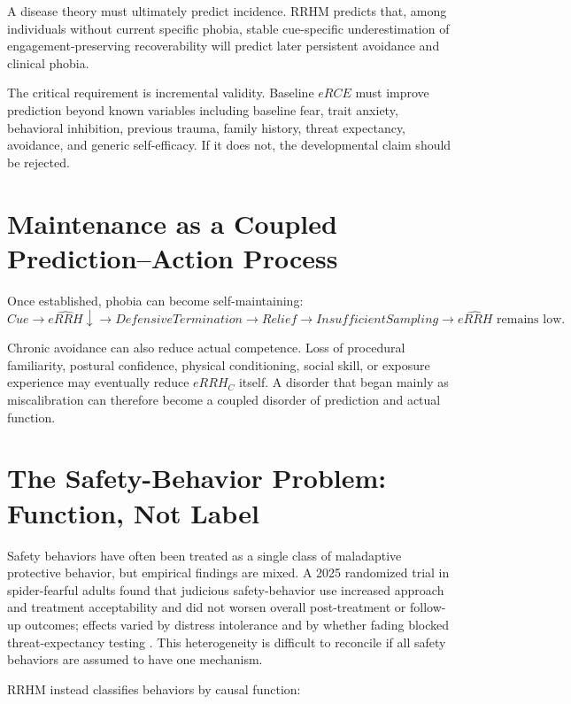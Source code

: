 \documentclass[11pt]{article}
\begin{document}
A disease theory must ultimately predict incidence. RRHM predicts that, among individuals without current specific phobia, stable cue-specific underestimation of engagement-preserving recoverability will predict later persistent avoidance and clinical phobia.

The critical requirement is incremental validity. Baseline $eRCE$ must improve prediction beyond known variables including baseline fear, trait anxiety, behavioral inhibition, previous trauma, family history, threat expectancy, avoidance, and generic self-efficacy. If it does not, the developmental claim should be rejected.

\section{Maintenance as a Coupled Prediction--Action Process}

Once established, phobia can become self-maintaining:
\[
Cue\rightarrow\widehat{eRRH}\downarrow\rightarrow DefensiveTermination\rightarrow Relief\rightarrow InsufficientSampling\rightarrow\widehat{eRRH}\text{ remains low}.
\]

Chronic avoidance can also reduce actual competence. Loss of procedural familiarity, postural confidence, physical conditioning, social skill, or exposure experience may eventually reduce $eRRH_C$ itself. A disorder that began mainly as miscalibration can therefore become a coupled disorder of prediction and actual function.

\section{The Safety-Behavior Problem: Function, Not Label}

Safety behaviors have often been treated as a single class of maladaptive protective behavior, but empirical findings are mixed. A 2025 randomized trial in spider-fearful adults found that judicious safety-behavior use increased approach and treatment acceptability and did not worsen overall post-treatment or follow-up outcomes; effects varied by distress intolerance and by whether fading blocked threat-expectancy testing \cite{meckes2025}. This heterogeneity is difficult to reconcile if all safety behaviors are assumed to have one mechanism.

RRHM instead classifies behaviors by causal function:
\end{document}
